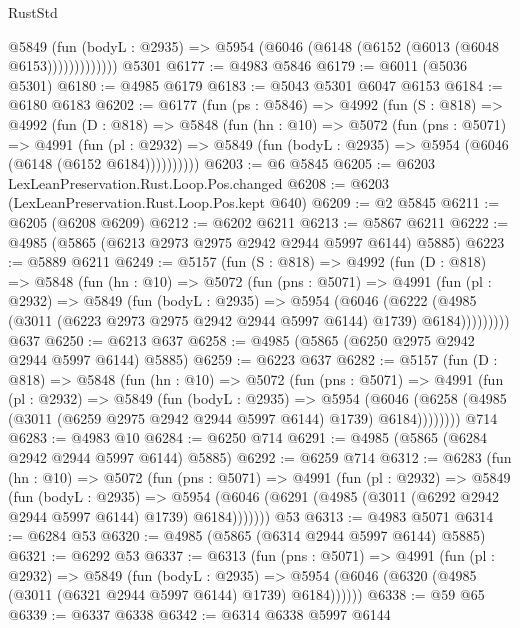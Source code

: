 \begin{lexlean}{RustStd}
\begin{coremodule}
                @5849
                  (fun (bodyL : @2935) =>
                  @5954 (@6046 (@6148 (@6152 (@6013 (@6048 @6153)))))))))))))
    @5301
@6177 := @4983 @5846
@6179 := @6011 (@5036 @5301)
@6180 := @4985 @6179
@6183 := @5043 @5301 @6047 @6153
@6184 := @6180 @6183
@6202 := @6177
    (fun (ps : @5846) =>
    @4992
      (fun (S : @818) =>
      @4992
        (fun (D : @818) =>
        @5848
          (fun (hn : @10) =>
          @5072
            (fun (pns : @5071) =>
            @4991
              (fun (pl : @2932) =>
              @5849 (fun (bodyL : @2935) => @5954 (@6046 (@6148 (@6152 @6184))))))))))
@6203 := @6 @5845
@6205 := @6203 LexLeanPreservation.Rust.Loop.Pos.changed
@6208 := @6203 (LexLeanPreservation.Rust.Loop.Pos.kept @640)
@6209 := @2 @5845
@6211 := @6205 (@6208 @6209)
@6212 := @6202 @6211
@6213 := @5867 @6211
@6222 := @4985 (@5865 (@6213 @2973 @2975 @2942 @2944 @5997 @6144) @5885)
@6223 := @5889 @6211
@6249 := @5157
    (fun (S : @818) =>
    @4992
      (fun (D : @818) =>
      @5848
        (fun (hn : @10) =>
        @5072
          (fun (pns : @5071) =>
          @4991
            (fun (pl : @2932) =>
            @5849
              (fun (bodyL : @2935) =>
              @5954
                (@6046
                  (@6222
                    (@4985 (@3011 (@6223 @2973 @2975 @2942 @2944 @5997 @6144) @1739) @6184)))))))))
    @637
@6250 := @6213 @637
@6258 := @4985 (@5865 (@6250 @2975 @2942 @2944 @5997 @6144) @5885)
@6259 := @6223 @637
@6282 := @5157
    (fun (D : @818) =>
    @5848
      (fun (hn : @10) =>
      @5072
        (fun (pns : @5071) =>
        @4991
          (fun (pl : @2932) =>
          @5849
            (fun (bodyL : @2935) =>
            @5954
              (@6046 (@6258 (@4985 (@3011 (@6259 @2975 @2942 @2944 @5997 @6144) @1739) @6184))))))))
    @714
@6283 := @4983 @10
@6284 := @6250 @714
@6291 := @4985 (@5865 (@6284 @2942 @2944 @5997 @6144) @5885)
@6292 := @6259 @714
@6312 := @6283
    (fun (hn : @10) =>
    @5072
      (fun (pns : @5071) =>
      @4991
        (fun (pl : @2932) =>
        @5849
          (fun (bodyL : @2935) =>
          @5954 (@6046 (@6291 (@4985 (@3011 (@6292 @2942 @2944 @5997 @6144) @1739) @6184)))))))
    @53
@6313 := @4983 @5071
@6314 := @6284 @53
@6320 := @4985 (@5865 (@6314 @2944 @5997 @6144) @5885)
@6321 := @6292 @53
@6337 := @6313
    (fun (pns : @5071) =>
    @4991
      (fun (pl : @2932) =>
      @5849
        (fun (bodyL : @2935) =>
        @5954 (@6046 (@6320 (@4985 (@3011 (@6321 @2944 @5997 @6144) @1739) @6184))))))
@6338 := @59 @65
@6339 := @6337 @6338
@6342 := @6314 @6338 @5997 @6144

\end{coremodule}
\end{lexlean}
